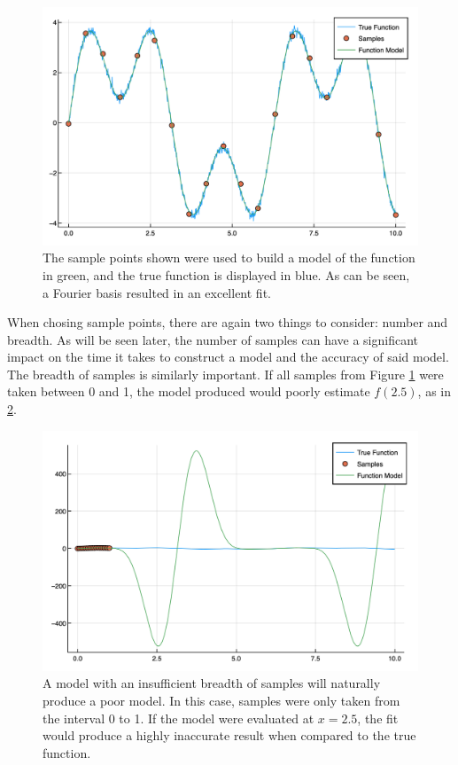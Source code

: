 \begin{figure}[h]
\includegraphics[scale = 0.27]{Figures/2dFourier}
\caption{The sample points shown were used to build a model of the function in green, and the true function is displayed in blue. As can be seen, a Fourier basis resulted in an excellent fit. 
\label{2dFourier}} 
\end{figure}

\par When chosing sample points, there are again two things to consider: number and breadth. As will be seen later, the number of samples can have a significant impact on the time it takes to construct a model and the accuracy of said model. The breadth of samples is similarly important. If all samples from Figure \ref{2dFourier} were taken between 0 and 1, the model produced would poorly estimate $f(2.5)$, as in \ref{poorSamps}. 

\begin{figure}[h]
\includegraphics[scale = 0.4]{Figures/poorSamps}
\caption{A model with an insufficient breadth of samples will naturally produce a poor model. In this case, samples were only taken from the interval 0 to 1. If the model were evaluated at $x=2.5$, the fit would produce a highly inaccurate result when compared to the true function.
\label{poorSamps}} 
\end{figure}

